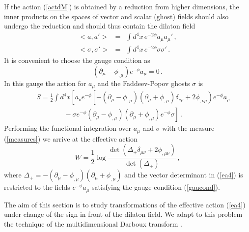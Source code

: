 \documentclass[a4paper,12pt]{article}
\begin{document}
If the action (\ref{actdM}) is obtained by a reduction from higher
dimensions, the inner products on the spaces of vector and scalar
(ghost) fields should also undergo the reduction and should thus
contain the dilaton field
\begin{eqnarray}
<a,a'>&=&\int d^4x\, e^{-2\phi} a_\mu {a_\mu}' \,,\nonumber \\
<\sigma ,\sigma'>&=&\int d^4x\, e^{-2\phi}\sigma \sigma' \,.
\label{measures}
\end{eqnarray}
It is convenient to choose the gauge condition as
\begin{equation}
(\partial_\mu -\phi_{,\mu} )e^{-\phi}a_\mu =0 \,.
\label{gaucond}
\end{equation}
In this gauge the action for $a_\mu$ and the Faddeev-Popov
ghosts $\sigma$ is
\begin{eqnarray}
&&S=\frac 12 \int d^4x \left[ a_\nu e^{-\phi} \left[
-(\partial_\mu -\phi_{,\mu })(\partial_\mu +\phi_{,\mu})
\delta_{\nu\rho} +2\phi_{,\nu\rho} \right) e^{-\phi} a_\rho
\right. \nonumber \\
&&\qquad\qquad -\left. \sigma e^{-\phi}(\partial_\mu
-\phi_{,\mu })(\partial_\mu +\phi_{,\mu})e^{-\phi}\sigma
\right] \,.\label{gfact}
\end{eqnarray}
Performing the functional integration over $a_\mu$ and $\sigma$
with the measure (\ref{measures}) we arrive at the
effective action
\begin{equation}
W=\frac 12 \log 
\frac{\det (\Delta_+\delta_{\mu\nu} +2\phi_{,\mu\nu})}{
\det (\Delta_+)} \,,\label{ea4}
\end{equation}
where $\Delta_+ =-(\partial_\mu -\phi_{,\mu })(\partial_\mu +\phi_{,\mu})$
and the vector determinant in (\ref{ea4}) is restricted to the fields
$e^{-\phi}a_\mu$ satisfying the gauge condition (\ref{gaucond}).

The aim of this section is to study transformations of the effective
action (\ref{ea4}) under change of the sign in front of the dilaton
field. We adapt to this problem the technique of the multidimensional
Darboux transform \cite{ABI}.
\end{document}
